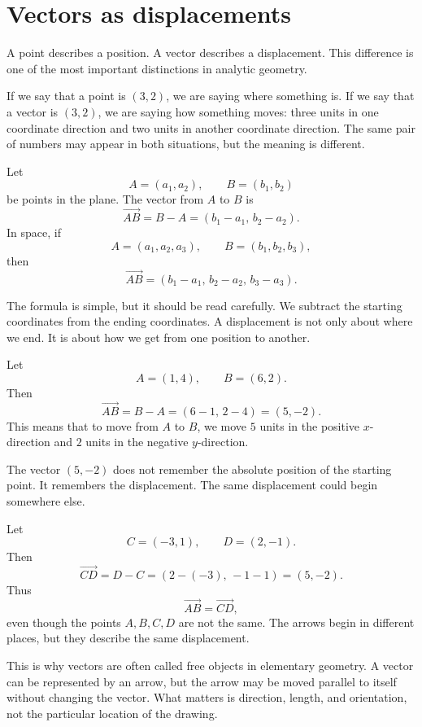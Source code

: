\section{Vectors as displacements}

A point describes a position. A vector describes a displacement. This difference is one of the most important distinctions in analytic geometry.

If we say that a point is \((3,2)\), we are saying where something is. If we say that a vector is \((3,2)\), we are saying how something moves: three units in one coordinate direction and two units in another coordinate direction. The same pair of numbers may appear in both situations, but the meaning is different.

\begin{definitionbox}
Let
\[
A=(a_1,a_2),
\qquad
B=(b_1,b_2)
\]
be points in the plane. The vector from \(A\) to \(B\) is
\[
\overrightarrow{AB}=B-A=(b_1-a_1,\,b_2-a_2).
\]
In space, if
\[
A=(a_1,a_2,a_3),
\qquad
B=(b_1,b_2,b_3),
\]
then
\[
\overrightarrow{AB}=(b_1-a_1,\,b_2-a_2,\,b_3-a_3).
\]
\end{definitionbox}

The formula is simple, but it should be read carefully. We subtract the starting coordinates from the ending coordinates. A displacement is not only about where we end. It is about how we get from one position to another.

\begin{examplebox}
Let
\[
A=(1,4),
\qquad
B=(6,2).
\]
Then
\[
\overrightarrow{AB}=B-A=(6-1,\,2-4)=(5,-2).
\]
This means that to move from \(A\) to \(B\), we move \(5\) units in the positive \(x\)-direction and \(2\) units in the negative \(y\)-direction.
\end{examplebox}

The vector \((5,-2)\) does not remember the absolute position of the starting point. It remembers the displacement. The same displacement could begin somewhere else.

\begin{examplebox}
Let
\[
C=(-3,1),
\qquad
D=(2,-1).
\]
Then
\[
\overrightarrow{CD}=D-C=(2-(-3),\,-1-1)=(5,-2).
\]
Thus
\[
\overrightarrow{AB}=\overrightarrow{CD},
\]
even though the points \(A,B,C,D\) are not the same. The arrows begin in different places, but they describe the same displacement.
\end{examplebox}

This is why vectors are often called free objects in elementary geometry. A vector can be represented by an arrow, but the arrow may be moved parallel to itself without changing the vector. What matters is direction, length, and orientation, not the particular location of the drawing.

